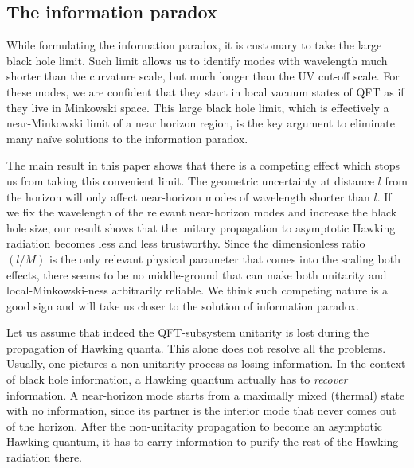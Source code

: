 \documentclass[aps,showpacs,onecolumn,floats,prd,superscriptaddress,nofootinbib]{revtex4-1}
\begin{document}
\subsection{The information paradox}

While formulating the information paradox, it is customary to take the large black hole limit.
Such limit allows us to identify modes with wavelength much shorter than the curvature scale, but much longer than the UV cut-off scale.
For these modes, we are confident that they start in local vacuum states of QFT as if they live in Minkowski space.
This large black hole limit, which is effectively a near-Minkowski limit of a near horizon region, is the key argument to eliminate many na\"ive solutions to the information paradox.

The main result in this paper shows that there is a competing effect which stops us from taking this convenient limit.
The geometric uncertainty at distance $l$ from the horizon will only affect near-horizon modes of wavelength shorter than $l$.
If we fix the wavelength of the relevant near-horizon modes and increase the black hole size, our result shows that the unitary propagation to asymptotic Hawking radiation becomes less and less trustworthy. 
Since the dimensionless ratio $(l/M)$ is the only relevant physical parameter that comes into the scaling both effects, there seems to be no middle-ground that can make both unitarity and local-Minkowski-ness arbitrarily reliable.
We think such competing nature is a good sign and will take us closer to the solution of information paradox.

Let us assume that indeed the QFT-subsystem unitarity is lost during the propagation of Hawking quanta.
This alone does not resolve all the problems. 
Usually, one pictures a non-unitarity process as losing information. 
In the context of black hole information, a Hawking quantum actually has to {\it recover} information. 
A near-horizon mode starts from a maximally mixed (thermal) state with no information, since its partner is the interior mode that never comes out of the horizon. 
After the non-unitarity propagation to become an asymptotic Hawking quantum, it has to carry information to purify the rest of the Hawking radiation there.
\end{document}
